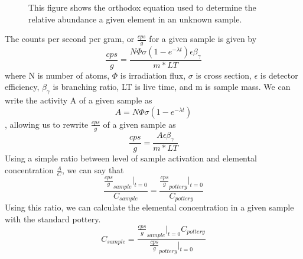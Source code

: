 \documentclass[]{article}
\begin{document}
\begin{figure}[h]
\centering
{}
\caption{This figure shows the orthodox equation used to determine the relative abundance a given element in an unknown sample.}
\end{figure}

The counts per second per gram, or $\frac{cps}{g}$ for a given sample is given by $$\frac{cps}{g} = \frac{N\Phi\sigma(1-e^{-\lambda t})\epsilon \beta_{ \gamma}}{m * LT}$$ where N is number of atoms, $\Phi$ is irradiation flux, $\sigma$ is cross section, $\epsilon$ is detector efficiency, $\beta_{\gamma}$ is branching ratio, LT is live time, and m is sample mass. We can write the activity A of a given sample as $$A=N\Phi\sigma(1-e^{-\lambda t})$$, allowing us to rewrite $\frac{cps}{g}$ of a given sample as $$\frac{cps}{g} = \frac{A\epsilon\beta_{\gamma}}{m*LT}$$ Using a simple ratio between level of sample activation and elemental concentration $\frac{A}{C}$, we can say that $$\frac{\frac{cps}{g}_{sample}|_{t=0}}{C_{sample}} = \frac{\frac{cps}{g}_{pottery}|_{t=0}}{C_{pottery}}$$ Using this ratio, we can calculate the elemental concentration in a given sample with the standard pottery. $$C_{sample} = \frac{\frac{cps}{g}_{sample}|_{t=0} C_{pottery}}{\frac{cps}{g}_{pottery}|_{t=0}}$$
\end{document}
